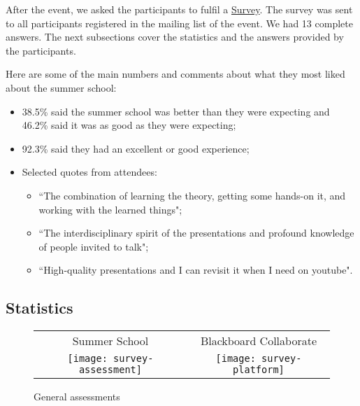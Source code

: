 After the event, we asked the participants to fulfil a \href{https://docs.google.com/forms/d/1UMMUGfos13HmsvMO6WFBrDXQkNIhOxoLooBBgoSde-I}{Survey}. The survey was sent to all participants registered in the mailing list of the event. We had 13 complete answers. The next subsections cover the statistics and the answers provided by the participants.

Here are some of the main numbers and comments about what they most liked about the summer school:

\begin{itemize}

\item 38.5\% said the summer school was better than they were expecting and 46.2\% said it was as good as they were expecting;

\item 92.3\% said they had an excellent or good experience;

\item Selected quotes from attendees:

\begin{itemize}

\item ``The combination of learning the theory, getting some hands-on it, and working with the learned things";
\item ``The interdisciplinary spirit of the presentations and profound knowledge of people invited to talk";
\item ``High-quality presentations and I can revisit it when I need on youtube".

\end{itemize}

\end{itemize}

\subsection{Statistics}

\begin{figure}[H]
\centering
\begin{tabular}{cc}
Summer School & \hspace{1cm} Blackboard Collaborate \\
\hspace{-2.5cm} \texttt{[image: survey-assessment]} &
\texttt{[image: survey-platform]}
\end{tabular}
\caption{General assessments}
\end{figure}


